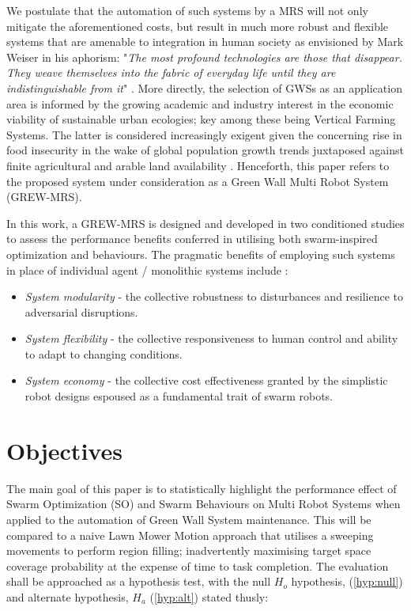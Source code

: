 \documentclass{report}
\begin{document}
We postulate that the automation of such systems by a MRS will not only mitigate the aforementioned costs, but result in much more robust and flexible systems that are amenable to integration in human society as envisioned by Mark Weiser in his aphorism: "\textit{The most profound technologies are those that disappear. They weave themselves into the fabric of everyday life until they are indistinguishable from it}" \cite{Weiser2002}. More directly, the selection of GWSs as an application area is informed by the growing academic \cite{Manso2015} \cite{Graamans2018} \cite{Neil2017} and industry \cite{Gmi2017} \cite{Holt2018} interest in the economic viability of sustainable urban ecologies; key among these being Vertical Farming Systems. The latter is considered increasingly exigent given the concerning rise in food insecurity \cite{Yang2018} in the wake of global population growth trends juxtaposed against finite agricultural and arable land availability \cite{Banerjee2014}. Henceforth, this paper refers to the proposed system under consideration as a Green Wall Multi Robot System (GREW-MRS).

In this work, a GREW-MRS is designed and developed in two conditioned studies to assess the performance benefits conferred in utilising both swarm-inspired optimization and behaviours. The pragmatic benefits of employing such systems in place of individual agent / monolithic systems include \cite{Yang2018}:
\begin{itemize}
	\item \textit{System modularity} - the collective robustness to disturbances and resilience to adversarial disruptions.
	\item \textit{System flexibility} - the collective responsiveness to human control and ability to adapt to changing conditions.
	\item \textit{System economy} - the collective cost effectiveness granted by the simplistic robot designs espoused as a fundamental trait of swarm robots.
\end{itemize}

\section{Objectives}\label{objectives}

The main goal of this paper is to statistically highlight the performance effect of Swarm Optimization (SO) and Swarm Behaviours on Multi Robot Systems when applied to the automation of Green Wall System maintenance. This will be compared to a naive Lawn Mower Motion \cite{Cao1988} approach that utilises a sweeping movements to perform region filling; inadvertently maximising target space coverage probability at the expense of time to task completion. The evaluation shall be approached as a hypothesis test, with the null $H_o$ hypothesis, (\ref{hyp:null}) and alternate hypothesis, $H_a$ (\ref{hyp:alt}) stated thusly:
\end{document}
